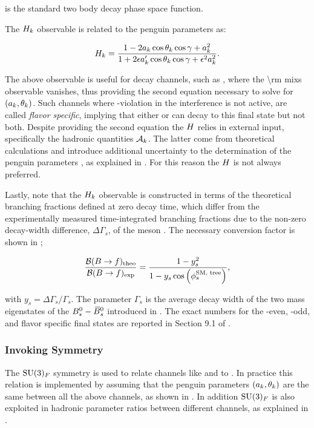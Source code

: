 \noindent is the standard two body decay phase space function.

The $H_{k}$ observable is related to the penguin parameters \cite{Fleischer:1999zi} as:

\begin{equation}
\centering
  \Hobs{k} = \frac{1-2\akPeng\cos\thkPeng\cos\gamma + \akPeng^2}{1+2\epsilon\akPengPrime\cos\thkPeng\cos\gamma + \epsilon^2\akPeng^2}.
\label{Hobs_peng_param}
\end{equation}

\noindent The above observable is useful for decay channels, such as \BsJpsiKst, where the \Acp{\rm mix} observable vanishes,
thus providing the second equation necessary to solve for $(a_k,\theta_k)$. Such channels
where \CP-violation in the interference is not active, are called {\it flavor specific}, implying
that either \Bs or \Bsb can decay to this final state but not both.
Despite providing the second equation the $H_{}$ relies in external input, specifically the hadronic quantities $\mathcal{A}_{k}$.
The latter come from theoretical calculations and introduce additional uncertainty to the determination of the penguin parameters
, as explained in . For this reason the $H_{}$ is not always preferred.

Lastly, note that the $H_{k}$ observable is constructed in terms of the theoretical branching fractions
defined at zero decay time, which differ from the experimentally measured time-integrated branching fractions \cite{DeBruyn:2012wj}
due to the non-zero decay-width difference, $\Delta\Gamma_s$, of the \Bs meson \cite{hfag-2014}. The necessary conversion factor
is shown in ;

\begin{equation}
  \centering
  \frac{\BRof{\B\to f}_{\rm theo}}{\BRof{\B\to f}_{\rm exp}} = \frac{1-y_s^2}{1-y_s\cos\parenthesis{\phiS{\rm SM, tree}}},
  \label{br_conversion_formula}
\end{equation}

\noindent with $y_s = \Delta\Gamma_s / \Gamma_s$. The parameter $\Gamma_s$ is the average decay width of the two
mass eigenstates of the $B^0_s-\kern 0.18em\overline{\kern -0.18em B}{}^0_s$ introduced in . The exact numbers for the \CP-even,
\CP-odd, and flavor specific final states are reported in Section 9.1 of \cite{bsjpsikst-paper}.

\subsubsection{Invoking \grpsuthree Symmetry}
The $\mathrm{SU}(3)_{F}$ symmetry is used to relate channels like \BsJpsiKst and \BsJpsiRho to \BsJpsiPhi.
In practice this relation is implemented by assuming that the penguin parameters $(a_k,\theta_k)$
are the same between all the above channels, as shown in . In addition $\mathrm{SU}(3)_{F}$
is also exploited in hadronic parameter ratios between different channels, as explained in .
